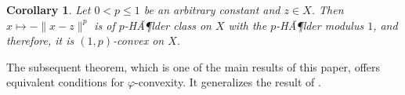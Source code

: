 \documentclass[12pt,leqno]{amsart}
\newtheorem{corollary}[theorem]{Corollary}
\newtheorem*{corollary*}{Corollary}
\theoremstyle{definition}
\begin{document}
{
             {\begin{corollary}\label{C{4}}{
Let $0<p\leq 1$ be an arbitrary constant and $z\in X$. Then $x \mapsto -\|x-z\|^p$ is
of $p$-HÃ¶lder class on $X$ with the $p$-HÃ¶lder modulus $1$, and therefore,
it is $(1,p)$-convex on $X$.
}\end{corollary}}}

The subsequent theorem, which is one of the main results of this paper,
offers equivalent conditions for $\varphi$-convexity. It generalizes the result
of \cite[Thm. 1]{Pal03a}.
\end{document}
